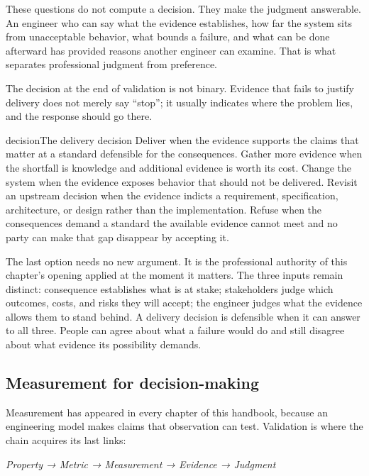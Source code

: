These questions do not compute a decision. They make the judgment answerable. An engineer who can
say what the evidence establishes, how far the system sits from unacceptable behavior, what bounds
a failure, and what can be done afterward has provided reasons another engineer can examine. That
is what separates professional judgment from preference.

The decision at the end of validation is not binary. Evidence that fails to justify delivery does
not merely say ``stop''; it usually indicates where the problem lies, and the response should go
there.

\begin{bookbox}{decision}{The delivery decision} %
Deliver when the evidence supports the claims that matter at a standard defensible for the
consequences. Gather more evidence when the shortfall is knowledge and additional evidence is worth
its cost. Change the system when the evidence exposes behavior that should not be delivered.
Revisit an upstream decision when the evidence indicts a requirement, specification, architecture,
or design rather than the implementation. Refuse when the consequences demand a standard the
available evidence cannot meet and no party can make that gap disappear by accepting it.
\end{bookbox}

The last option needs no new argument. It is the professional authority of this chapter's opening
applied at the moment it matters. The three inputs remain distinct: consequence establishes what is
at stake; stakeholders judge which outcomes, costs, and risks they will accept; the engineer judges
what the evidence allows them to stand behind. A delivery decision is defensible when it can answer
to all three. People can agree about what a failure would do and still disagree about what evidence
its possibility demands.

\subsection{Measurement for decision-making}\label{sec-measurement-validation}

Measurement has appeared in every chapter of this handbook, because an engineering model makes
claims that observation can test. Validation is where the chain acquires its last links:

\emph{Property → Metric → Measurement → Evidence → Judgment}

